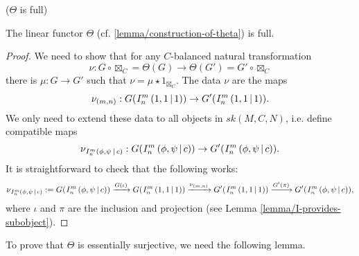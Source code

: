 \begin{lemma}\label{lemma/theta-is-full} ($\Theta$ is full)

  \noindent The linear functor $\Theta$ (cf. \ref{lemma/construction-of-theta}) is full.
\end{lemma}

\begin{proof}
  We need to show that for any $C$-balanced natural transformation
  \[
    \nu: G \circ \boxtimes_{C} = \Theta(G) \to \Theta(G') = G' \circ \boxtimes_{C}
  \]
  there is $\mu: G \to G'$ such that $\nu = \mu \star 1_{\boxtimes_{C}}$. The data $\nu$ are the maps
  \[
    \nu_{(m,n)}: G({}^{}_{} I^{m}_{n} \left( 1, 1 \,\middle|\, 1 \right)) \to G'({}^{}_{} I^{m}_{n} \left( 1, 1 \,\middle|\, 1 \right)).
  \]
  We only need to extend these data to all objects in $sk(M,C,N)$, i.e. define compatible maps
  \[
    \nu_{{}^{}_{} I^{m}_{n} \left( \phi, \psi \,\middle|\, c \right)}: G({}^{}_{} I^{m}_{n} \left( \phi, \psi \,\middle|\, c \right)) \to G'({}^{}_{} I^{m}_{n} \left( \phi, \psi \,\middle|\, c \right)).
  \]
  It is straightforward to check that the following works:
  \[
    \nu_{{}^{}_{} I^{m}_{n} \left( \phi, \psi \,\middle|\, c \right)}:= G({}^{}_{} I^{m}_{n} \left( \phi, \psi \,\middle|\, c \right))
    \xrightarrow{G(\iota)}
    G({}^{}_{} I^{m}_{n} \left( 1, 1 \,\middle|\, 1 \right))
    \xrightarrow{\nu_{(m,n)}}
    G'({}^{}_{} I^{m}_{n} \left( 1, 1 \,\middle|\, 1 \right))
    \xrightarrow{G'(\pi)}
    G'({}^{}_{} I^{m}_{n} \left( \phi, \psi \,\middle|\, c \right)),
  \]
  where $\iota$ and $\pi$ are the inclusion and projection (see
  Lemma \ref{lemma/I-provides-subobject}).
\end{proof}

\noindent To prove that $\Theta$ is essentially surjective, we need the following
lemma.

